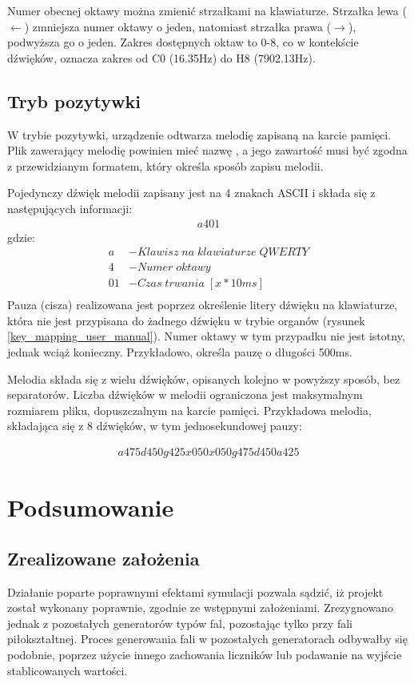 \documentclass[a4paper,12pt]{article}
\begin{document}
Numer obecnej oktawy można zmienić strzałkami na klawiaturze. Strzałka lewa ($\leftarrow$) zmniejsza numer oktawy o jeden, natomiast strzałka prawa ($\rightarrow$), podwyższa go o jeden. Zakres dostępnych oktaw to 0-8, co w kontekście dźwięków, oznacza zakres od C0 (16.35Hz) do H8 (7902.13Hz).

\clearpage
\subsection{Tryb pozytywki}

W trybie pozytywki, urządzenie odtwarza melodię zapisaną na karcie pamięci. Plik zawerający melodię powinien mieć nazwę , a jego zawartość musi być zgodna z przewidzianym formatem, który określa sposób zapisu melodii.

Pojedynczy dźwięk melodii zapisany jest na 4 znakach ASCII i składa się z następujących informacji:
\begin{align*}
  a401
\end{align*}
gdzie:
\begin{align*}
  a                & - Klawisz\;na\;klawiaturze\;QWERTY \\
  4                & - Numer\;oktawy                           \\
  01 & - Czas\;trwania\;[x*10ms]           \\
\end{align*}
Pauza (cisza) realizowana jest poprzez określenie litery dźwięku na klawiaturze, która nie jest przypisana do żadnego dźwięku w trybie organów (rysunek \ref{key_mapping_user_manual}). Numer oktawy w tym przypadku nie jest istotny, jednak wciąż konieczny. Przykładowo,  określa pauzę o długości 500ms.

Melodia składa się z wielu dźwięków, opisanych kolejno w powyższy sposób, bez separatorów. Liczba dźwięków w melodii ograniczona jest maksymalnym rozmiarem pliku, dopuszczalnym na karcie pamięci. 
Przykładowa melodia, składająca się z 8 dźwięków, w tym jednosekundowej pauzy:

\begin{align*}
  a475d450g425x050x050g475d450a425
\end{align*}

\clearpage
\section{Podsumowanie}

\subsection{Zrealizowane założenia}
Działanie poparte poprawnymi efektami symulacji pozwala sądzić, iż projekt został wykonany poprawnie, zgodnie ze wstępnymi założeniami. Zrezygnowano jednak z pozostałych generatorów typów fal, pozostając tylko przy fali piłokształtnej. Proces generowania fali w pozostałych generatorach odbywałby się podobnie, poprzez użycie innego zachowania liczników lub podawanie na wyjście stablicowanych wartości.
\end{document}
